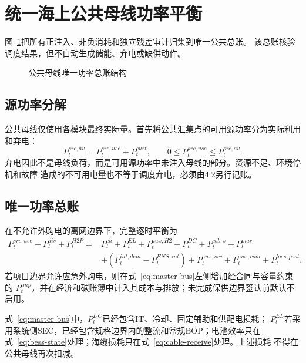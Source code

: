 \section{统一海上公共母线功率平衡}
\label{sec:power-balance}

图~\ref{fig:bus-ledger}把所有正注入、非负消耗和独立残差审计归集到唯一公共总账。
该总账核验调度结果，但不自动生成储能、弃电或缺供动作。
\begin{figure}[H]
\centering
\resizebox{0.91\textwidth}{!}{}
\caption{公共母线唯一功率总账结构}
\label{fig:bus-ledger}
\end{figure}

\subsection{源功率分解}

公共母线仅使用各模块最终实际量。首先将公共汇集点的可用源功率分为实际利用和弃电：
\begin{equation}
P_t^{src,av}=P_t^{src,use}+P_t^{curt},
\qquad 0\le P_t^{src,use}\le P_t^{src,av}.
\label{eq:bus-source-split}
\end{equation}
弃电因此不是母线负荷，而是可用源功率中未注入母线的部分。资源不足、环境停机和故障
造成的不可用电量也不等于调度弃电，必须由4.2另行记账。

\subsection{唯一功率总账}

在不允许外购电的离网边界下，完整逐时平衡为
\begin{equation}
\begin{aligned}
P_t^{src,use}+P_t^{dis}+P_t^{H2P}
={}&P_t^{ch}+P_t^{EL}+P_t^{aux,H2}+P_t^{DC}
+P_t^{cab,s}+P_t^{mar}\\
&+\left(P_t^{int,dem}-P_t^{ENS,int}\right)
+P_t^{aux,src}+P_t^{aux,com}+P_t^{loss,post}.
\end{aligned}
\label{eq:master-bus}
\end{equation}
若项目边界允许应急外购电，则在式~\eqref{eq:master-bus}左侧增加经合同与容量约束的
$P_t^{imp}$，并在经济和碳账簿中计入其成本与排放；未完成保供边界签认前默认不启用。

式~\eqref{eq:master-bus}中，$P_t^{DC}$已经包含IT、冷却、固定辅助和供配电损耗；
$P_t^{EL}$若采用系统侧SEC，已经包含规格边界内的整流和常规BOP；电池效率只在
式~\eqref{eq:bess-state}处理；海缆损耗只在式~\eqref{eq:cable-receive}处理。上述损耗
不得在公共母线再次扣减。

